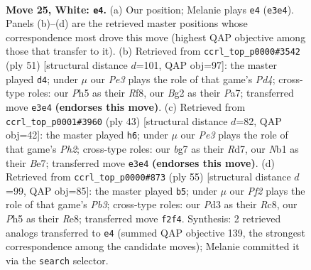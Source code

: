 \documentclass[11pt]{article}
\begin{document}
\clearpage

\begin{figure}[p]\centering
\begin{subfigure}{0.46\textwidth}\centering
\resizebox{\linewidth}{!}{%
\newchessgame
\chessboard[
  setfen={nrbr2k1/5pb1/p6p/2p1p1qP/1p5n/3PP3/PPQ2PB1/RNB1NRK1 w - - 0 25},
  showmover=false,
  pgfstyle=straightmove, color=movearrow, markmove={e3-e4}
]}
\caption{}
\end{subfigure}\hfill
\begin{subfigure}{0.46\textwidth}\centering
\resizebox{\linewidth}{!}{%
\newchessgame
\chessboard[
  setfen={5r2/pb1r1ppk/1p1bqn1p/1N1p4/7P/3RPQP1/PP3PB1/3RB1K1 b - - 4 26},
  showmover=false,
  pgfstyle=straightmove, color=movearrow, markmove={d5-d4}
]}
\caption{}
\end{subfigure}
\\[4pt]
\begin{subfigure}{0.46\textwidth}\centering
\resizebox{\linewidth}{!}{%
\newchessgame
\chessboard[
  setfen={1r2n1k1/2qrbppp/2bpp3/1p6/1P1BPP2/2NR1BQ1/2P3PP/4R2K b - - 2 22},
  showmover=false,
  pgfstyle=straightmove, color=movearrow, markmove={h7-h6}
]}
\caption{}
\end{subfigure}\hfill
\begin{subfigure}{0.46\textwidth}\centering
\resizebox{\linewidth}{!}{%
\newchessgame
\chessboard[
  setfen={2r1rbk1/1q1n1ppb/1p5p/p1pP4/P6P/1PQN1BP1/1B2RP2/3R2K1 b - - 0 28},
  showmover=false,
  pgfstyle=straightmove, color=movearrow, markmove={b6-b5}
]}
\caption{}
\end{subfigure}
\caption{\textbf{Move 25, White: \texttt{e4}.} (a) Our position; Melanie plays \texttt{e4} (\texttt{e3e4}). Panels (b)--(d) are the retrieved master positions whose correspondence most drove this move (highest QAP objective among those that transfer to it). (b) Retrieved from \texttt{ccrl\_top\_p0000\#3542} (ply 51) [structural distance $d$=101, QAP obj=97]: the master played \texttt{d4}; under $\mu$ our \emph{Pe3} plays the role of that game's \emph{Pd4}; cross-type roles: our \emph{P}h5 as their \emph{R}f8, our \emph{B}g2 as their \emph{P}a7; transferred move \texttt{e3e4} \textbf{(endorses this move)}. (c) Retrieved from \texttt{ccrl\_top\_p0001\#3960} (ply 43) [structural distance $d$=82, QAP obj=42]: the master played \texttt{h6}; under $\mu$ our \emph{Pe3} plays the role of that game's \emph{Ph2}; cross-type roles: our \emph{b}g7 as their \emph{R}d7, our \emph{N}b1 as their \emph{B}e7; transferred move \texttt{e3e4} \textbf{(endorses this move)}. (d) Retrieved from \texttt{ccrl\_top\_p0000\#873} (ply 55) [structural distance $d$=99, QAP obj=85]: the master played \texttt{b5}; under $\mu$ our \emph{Pf2} plays the role of that game's \emph{Pb3}; cross-type roles: our \emph{P}d3 as their \emph{R}c8, our \emph{P}h5 as their \emph{R}e8; transferred move \texttt{f2f4}. Synthesis: 2 retrieved analogs transferred to \texttt{e4} (summed QAP objective 139, the strongest correspondence among the candidate moves); Melanie committed it via the \texttt{search} selector.}
\label{fig:thought-m48}
\end{figure}
\end{document}
